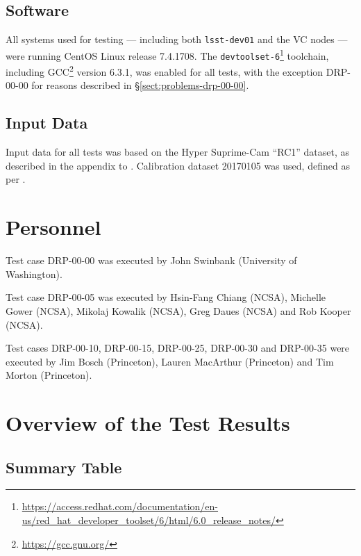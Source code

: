 \documentclass[DM,STR,toc]{lsstdoc}
\begin{document}
\subsection{Software}
\label{sect:swconf}

All systems used for testing --- including both \texttt{lsst-dev01} and the VC nodes --- were running CentOS Linux release 7.4.1708.
The \texttt{devtoolset-6}\footnote{\url{https://access.redhat.com/documentation/en-us/red_hat_developer_toolset/6/html/6.0_release_notes/}} toolchain, including GCC\footnote{\url{https://gcc.gnu.org/}} version 6.3.1, was enabled for all tests, with the exception DRP-00-00 for reasons described in \S\ref{sect:problems-drp-00-00}.

\subsection{Input Data}
\label{sect:inputdata}

Input data for all tests was based on the Hyper Suprime-Cam “RC1” dataset, as described in the appendix to .
Calibration dataset 20170105 was used, defined as per .

\section{Personnel}
\label{sect:personnel}

Test case DRP-00-00 was executed by John Swinbank (University of Washington).

Test case DRP-00-05 was executed by Hsin-Fang Chiang (NCSA), Michelle Gower (NCSA), Mikolaj Kowalik (NCSA), Greg Daues (NCSA) and Rob Kooper (NCSA).

Test cases DRP-00-10, DRP-00-15, DRP-00-25, DRP-00-30 and DRP-00-35 were executed by Jim Bosch (Princeton), Lauren MacArthur (Princeton) and Tim Morton (Princeton).

\newpage

\section{Overview of the Test Results}
\label{sect:overview}

\subsection{Summary Table}
\label{sect:summarytable}
\end{document}

